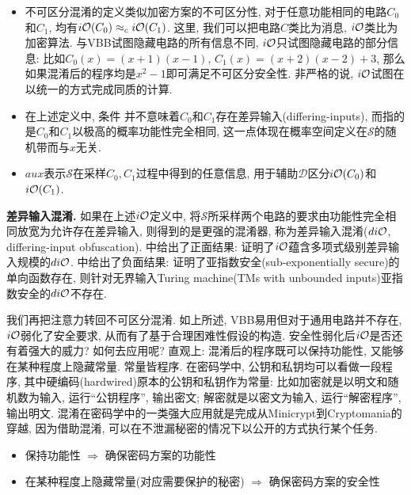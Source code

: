 \begin{remark}
\begin{itemize}
\item 不可区分混淆的定义类似加密方案的不可区分性, 对于任意功能相同的电路$C_0$和$C_1$, 均有$i\mathcal{O}(C_0) \approx_c i\mathcal{O}(C_1)$. 
    这里, 我们可以把电路$C$类比为消息, $i\mathcal{O}$类比为加密算法. 与VBB试图隐藏电路的所有信息不同, 
    $i\mathcal{O}$只试图隐藏电路的部分信息: 比如$C_0(x) = (x+1)(x-1)$, $C_1(x) = (x+2)(x-2)+3$,    
    那么如果混淆后的程序均是$x^2-1$即可满足不可区分安全性.
    非严格的说, $i\mathcal{O}$试图在以统一的方式完成同质的计算. 

\item 在上述定义中, 条件
    并不意味着$C_0$和$C_1$存在差异输入(differing-inputs), 而指的是$C_0$和$C_1$以极高的概率功能性完全相同, 
    这一点体现在概率空间定义在$\mathcal{S}$的随机带而与$x$无关. 

\item $aux$表示$\mathcal{S}$在采样$C_0, C_1$过程中得到的任意信息, 用于辅助$\mathcal{D}$区分$i\mathcal{O}(C_0)$和$i\mathcal{O}(C_1)$. 
\end{itemize}
\end{remark}

\begin{trivlist}
\item \textbf{差异输入混淆.} 如果在上述$i\mathcal{O}$定义中, 将$\mathcal{S}$所采样两个电路的要求由功能性完全相同放宽为允许存在差异输入, 
    则得到的是更强的混淆器, 称为差异输入混淆($di\mathcal{O}$, differing-input obfuscation). 
    \cite{BCP-TCC-2014}中给出了正面结果: 证明了$i\mathcal{O}$蕴含多项式级别差异输入规模的$di\mathcal{O}$. 
    \cite{BSW-EUROCRYPT-2016}中给出了负面结果: 证明了亚指数安全(sub-exponentially secure)的单向函数存在, 
    则针对无界输入Turing machine(TMs with unbounded inputs)亚指数安全的$di\mathcal{O}$不存在.  
\end{trivlist}

我们再把注意力转回不可区分混淆. 如上所述, VBB易用但对于通用电路并不存在, $i\mathcal{O}$弱化了安全要求, 从而有了基于合理困难性假设的构造. 
安全性弱化后$i\mathcal{O}$是否还有着强大的威力? 如何去应用呢? 
直观上: 混淆后的程序既可以保持功能性, 又能够在某种程度上隐藏常量. 
常量皆程序. 在密码学中, 公钥和私钥均可以看做一段程序, 其中硬编码(hardwired)原本的公钥和私钥作为常量: 比如加密就是以明文和随机数为输入, 运行``公钥程序'', 输出密文; 
解密就是以密文为输入, 运行``解密程序'', 输出明文. 
混淆在密码学中的一类强大应用就是完成从Minicrypt到Cryptomania的穿越, 因为借助混淆, 可以在不泄漏秘密的情况下以公开的方式执行某个任务.  
\begin{itemize}
    \item 保持功能性 $\Rightarrow$ 确保密码方案的功能性
    \item 在某种程度上隐藏常量(对应需要保护的秘密) $\Rightarrow$ 确保密码方案的安全性
\end{itemize}

